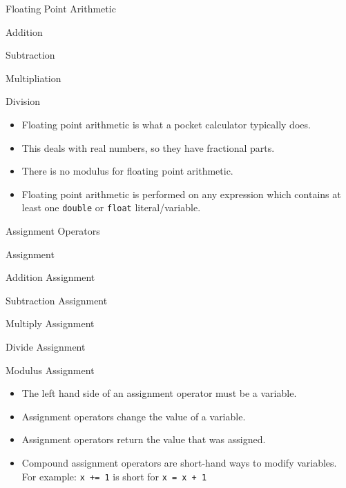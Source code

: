 \documentclass[]{beamer}
\begin{document}
\begin{frame}{Floating Point Arithmetic}
    \begin{description}[<+->]
        \item[$+$] Addition
        \item[$-$] Subtraction
        \item[$*$] Multipliation
        \item[$/$] Division
    \end{description}

    \begin{itemize}[<+->]
        \item Floating point arithmetic is what a pocket calculator
            typically does.
        \item This deals with real numbers, so they have fractional
            parts.
        \item There is no modulus for floating point arithmetic.
        \item Floating point arithmetic is performed on any expression
            which contains at least one \texttt{double} or
            \texttt{float} literal/variable.
    \end{itemize}
\end{frame}

\begin{frame}{Assignment Operators}
    \begin{description}[<+->]
        \item[\texttt{=}] Assignment
        \item[\texttt{+=}] Addition Assignment
        \item[\texttt{-=}] Subtraction Assignment
        \item[\texttt{*=}] Multiply Assignment
        \item[\texttt{/=}] Divide Assignment
        \item[\texttt{\%=}] Modulus Assignment
    \end{description}

    \begin{itemize}[<+->]
        \item The left hand side of an assignment operator must be
            a variable.
        \item Assignment operators change the value of a variable.
        \item Assignment operators return the value that was assigned.
        \item Compound assignment operators are short-hand ways to
        modify variables.  For example:
        \newline\texttt{x += 1} is short for \texttt{x = x + 1}
    \end{itemize}
\end{frame}
\end{document}
